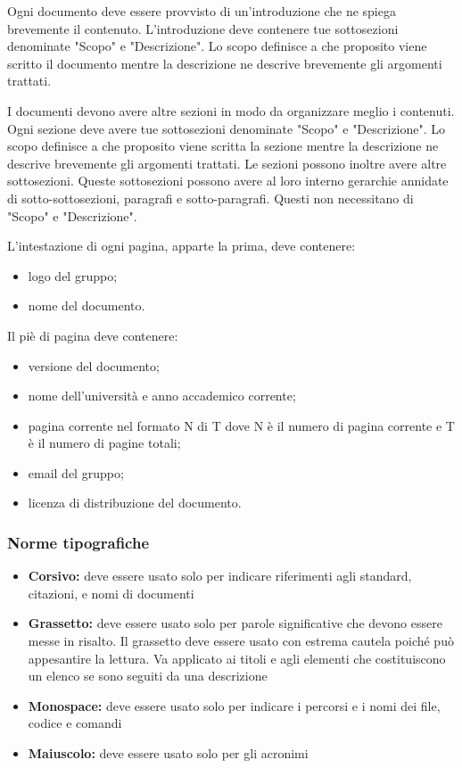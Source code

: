 \documentclass[12pt,a4paper]{article}
\begin{document}
Ogni documento deve essere provvisto di un'introduzione che ne spiega brevemente il contenuto. L'introduzione deve contenere tue sottosezioni denominate "Scopo" e "Descrizione". Lo scopo definisce a che proposito viene scritto il documento mentre la descrizione ne descrive brevemente gli argomenti trattati.

I documenti devono avere altre sezioni in modo da organizzare meglio i contenuti. Ogni sezione deve avere tue sottosezioni denominate "Scopo" e "Descrizione". Lo scopo definisce a che proposito viene scritta la sezione mentre la descrizione ne descrive brevemente gli argomenti trattati. Le sezioni possono inoltre avere altre sottosezioni. Queste sottosezioni possono avere al loro interno gerarchie annidate di sotto-sottosezioni,  paragrafi e sotto-paragrafi. Questi non necessitano di "Scopo" e "Descrizione".

L'intestazione di ogni pagina, apparte la prima, deve contenere:
\begin{itemize}
	\item logo del gruppo;
	\item nome del documento.
\end{itemize}
Il piè di pagina deve contenere:
\begin{itemize}
	\item versione del documento;
	\item nome dell'università e anno accademico corrente;
	\item pagina corrente nel formato N di T dove N è il numero di pagina corrente e T è il numero di pagine totali;
	\item email del gruppo;
	\item licenza di distribuzione del documento.
\end{itemize}

\subsubsection{Norme tipografiche}\label{norme tipografiche}

\begin{itemize}
	\item \textbf{Corsivo:} deve essere usato solo per indicare riferimenti agli standard, citazioni,  e nomi di documenti
	\item \textbf{Grassetto:} deve essere usato solo per parole significative che devono essere messe in risalto. Il grassetto deve essere usato con estrema cautela poiché può appesantire la lettura. Va applicato ai titoli e agli elementi che costituiscono un elenco se sono seguiti da una descrizione
	\item \textbf{Monospace:} deve essere usato solo per indicare i percorsi e i nomi dei file, codice e comandi
	\item \textbf{Maiuscolo:} deve essere usato solo per gli acronimi
\end{itemize}
\end{document}
